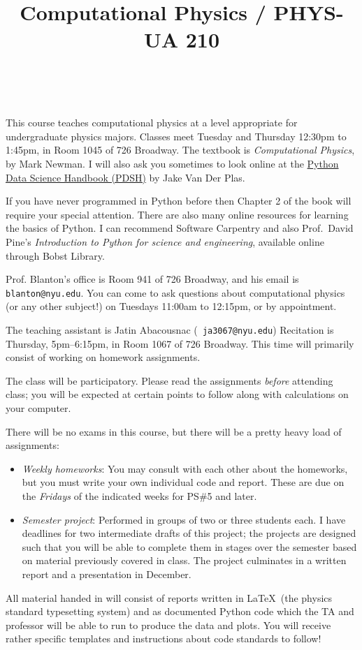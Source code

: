 \documentclass[11pt, preprint]{aastex}
\begin{document}
\title{\bf Computational Physics / PHYS-UA 210}
~
~

\noindent This course teaches computational physics at a level
appropriate for undergraduate physics majors.  Classes meet Tuesday
and Thursday 12:30pm to 1:45pm, in Room 1045 of 726 Broadway.  The
textbook is {\it Computational Physics}, by Mark Newman. I will also
ask you sometimes to look online at the
\href{https://jakevdp.github.io/PythonDataScienceHandbook/}{Python
  Data Science Handbook (PDSH)} by Jake Van Der Plas.

\noindent If you have never programmed in Python before then Chapter 2
of the book will require your special attention. There are also many
online resources for learning the basics of Python. I can recommend
Software Carpentry and also Prof.~David Pine's {\it Introduction to
  Python for science and engineering}, available online through Bobst
Library.

\noindent Prof. Blanton's office is Room 941 of 726 Broadway, and his
email is {\tt blanton@nyu.edu}. You can come to ask questions about
computational physics (or any other subject!) on Tuesdays 11:00am to
12:15pm, or by appointment.

\noindent The teaching assistant is Jatin Abacousnac ({\tt
  ja3067@nyu.edu}) Recitation is Thursday, 5pm--6:15pm, in Room 1067
of 726 Broadway. This time will primarily consist of working on
homework assignments.

\noindent The class will be participatory. Please read the assignments
          {\it before} attending class; you will be expected at
          certain points to follow along with calculations on your
          computer.

\noindent There will be no exams in this course, but there will be a
pretty heavy load of assignments:
\begin{itemize}
\item {\it Weekly homeworks}: You may consult with each other about
  the homeworks, but you must write your own individual code and
  report. These are due on the {\it Fridays} of the indicated weeks
  for PS\#5 and later.
\item {\it Semester project}: Performed in groups of two or three
  students each. I have deadlines for two intermediate drafts of this
  project; the projects are designed such that you will be able to
  complete them in stages over the semester based on material
  previously covered in class. The project culminates in a written
  report and a presentation in December.
\end{itemize}
All material handed in will consist of reports written in \LaTeX\ (the
physics standard typesetting system) and as documented Python code
which the TA and professor will be able to run to produce the data and
plots. You will receive rather specific templates and instructions
about code standards to follow!
\end{document}
